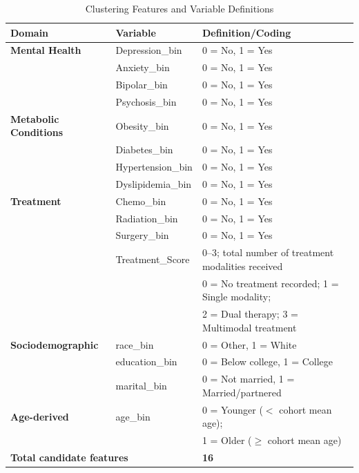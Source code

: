 \documentclass[11pt]{article}
\begin{document}
\begin{table}[H]
\centering
\caption{Clustering Features and Variable Definitions}
\label{tab:clustering_features}
\begin{tabular}{p{3.2cm}p{5.0cm}p{6.0cm}}
\hline
\textbf{Domain} & \textbf{Variable} & \textbf{Definition/Coding} \\
\hline

\textbf{Mental Health} & Depression\_bin & 0 = No, 1 = Yes \\
& Anxiety\_bin & 0 = No, 1 = Yes \\
& Bipolar\_bin & 0 = No, 1 = Yes \\
& Psychosis\_bin & 0 = No, 1 = Yes \\

\hline

\textbf{Metabolic Conditions} & Obesity\_bin & 0 = No, 1 = Yes \\
& Diabetes\_bin & 0 = No, 1 = Yes \\
& Hypertension\_bin & 0 = No, 1 = Yes \\
& Dyslipidemia\_bin & 0 = No, 1 = Yes \\

\hline

\textbf{Treatment} & Chemo\_bin & 0 = No, 1 = Yes \\
& Radiation\_bin & 0 = No, 1 = Yes \\
& Surgery\_bin & 0 = No, 1 = Yes \\
& Treatment\_Score & 0--3; total number of treatment modalities received \\
& & 0 = No treatment recorded; 1 = Single modality; \\
& & 2 = Dual therapy; 3 = Multimodal treatment \\

\hline

\textbf{Sociodemographic} & race\_bin & 0 = Other, 1 = White \\
& education\_bin & 0 = Below college, 1 = College \\
& marital\_bin & 0 = Not married, 1 = Married/partnered \\

\hline

\textbf{Age-derived} & age\_bin & 0 = Younger ($<$ cohort mean age); \\
& & 1 = Older ($\geq$ cohort mean age) \\

\hline


\multicolumn{2}{l}{\textbf{Total candidate features}} & \textbf{16} \\


\end{tabular}
\end{table}
\end{document}
